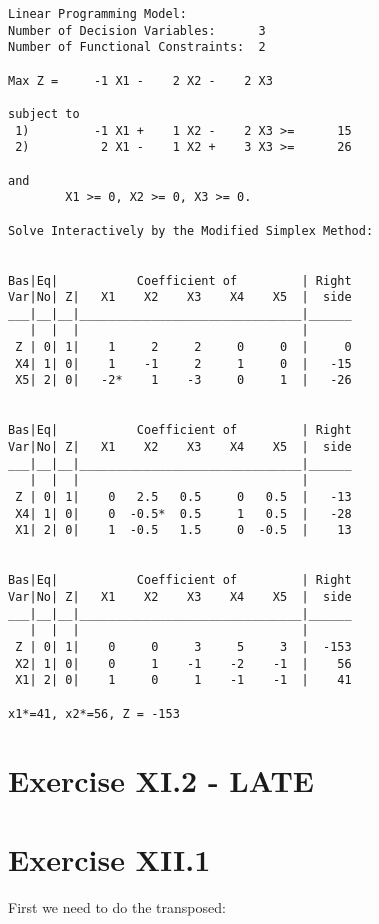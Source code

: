 \documentclass[titlepage, letterpaper]{article}
\begin{document}
\begin{lstlisting}[basicstyle=\tiny]
Linear Programming Model:
Number of Decision Variables:      3
Number of Functional Constraints:  2

Max Z =     -1 X1 -    2 X2 -    2 X3 

subject to
 1)         -1 X1 +    1 X2 -    2 X3 >=      15
 2)          2 X1 -    1 X2 +    3 X3 >=      26

and
        X1 >= 0, X2 >= 0, X3 >= 0.

Solve Interactively by the Modified Simplex Method:


Bas|Eq|           Coefficient of         | Right
Var|No| Z|   X1    X2    X3    X4    X5  |  side
___|__|__|_______________________________|______
   |  |  |                               | 
 Z | 0| 1|    1     2     2     0     0  |     0
 X4| 1| 0|    1    -1     2     1     0  |   -15
 X5| 2| 0|   -2*    1    -3     0     1  |   -26


Bas|Eq|           Coefficient of         | Right
Var|No| Z|   X1    X2    X3    X4    X5  |  side
___|__|__|_______________________________|______
   |  |  |                               | 
 Z | 0| 1|    0   2.5   0.5     0   0.5  |   -13
 X4| 1| 0|    0  -0.5*  0.5     1   0.5  |   -28
 X1| 2| 0|    1  -0.5   1.5     0  -0.5  |    13


Bas|Eq|           Coefficient of         | Right
Var|No| Z|   X1    X2    X3    X4    X5  |  side
___|__|__|_______________________________|______
   |  |  |                               | 
 Z | 0| 1|    0     0     3     5     3  |  -153
 X2| 1| 0|    0     1    -1    -2    -1  |    56
 X1| 2| 0|    1     0     1    -1    -1  |    41

x1*=41, x2*=56, Z = -153
\end{lstlisting}


\section{Exercise XI.2 - LATE} %
\label{sec:exercise_xi_2}


\section{Exercise XII.1} %
\label{sec:exercise_xii_1}

First we need to do the transposed:
\end{document}
